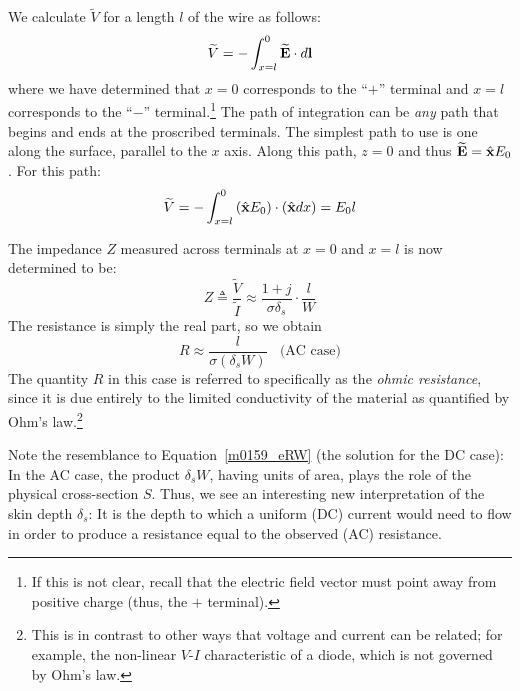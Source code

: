 We calculate $\widetilde{V}$ for a length $l$ of the wire as follows:
%
\begin{equation}
\widetilde{V} = -\int_{x=l}^{0} \widetilde{\bf E}\cdot d{\bf l}
\end{equation}
%
where we have determined that $x=0$ corresponds to the ``$+$'' terminal and $x=l$ corresponds to the ``$-$'' terminal.\footnote{If this is not clear, recall that the electric field vector must point away from positive charge (thus, the $+$ terminal).}
The path of integration can be {\it any} path that begins and ends at the proscribed terminals.  
The simplest path to use is one along the surface, parallel to the $x$ axis.
Along this path, $z=0$ and thus $\widetilde{\bf E}=\hat{\bf x}E_0$.  
For this path:
%
\begin{equation}
\widetilde{V} = -\int_{x=l}^{0} \left(\hat{\bf x}E_0\right)\cdot \left(\hat{\bf x}dx\right) 
  = E_0 l
\label{m0159_eV}
\end{equation}

The impedance $Z$ measured across terminals at $x=0$ and $x=l$ is now determined to be:
%
\begin{equation}
Z \triangleq \frac{\widetilde{V}}{\widetilde{I}} \approx \frac{1+j}{\sigma\delta_s} \cdot \frac{l}{W}
\label{m0159_eCFGC-Z}
\end{equation}
%
The resistance is simply the real part, so we obtain
%
\begin{equation}
R \approx \frac{l}{\sigma(\delta_s W)} ~~~~\mbox{(AC case)}
\label{m0159_eACZ}
\end{equation}
%
The quantity $R$ in this case is referred to specifically as the \emph{ohmic resistance}, since it is due entirely to the limited conductivity of the material as quantified by Ohm's law.\footnote{This is in contrast to other ways that voltage and current can be related; for example, the non-linear $V$-$I$ characteristic of a diode, which is not governed by Ohm's law.}

Note the resemblance to Equation~\ref{m0159_eRW} (the solution for the DC case):  In the AC case, the product $\delta_s W$, having units of area, plays the role of the physical cross-section $S$.  Thus, we see an interesting new interpretation of the skin depth $\delta_s$: 
It is the depth to which a uniform (DC) current would need to flow in order to produce a resistance equal to the observed (AC) resistance.

